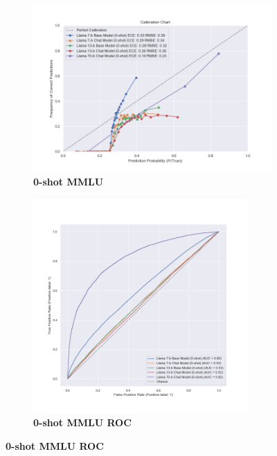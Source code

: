 \documentclass[11pt]{article}
\begin{document}
\begin{figure}
     \centering
     \begin{subfigure}[b]{0.60\textwidth}
         \centering 
         \includegraphics[width=1.1\textwidth]{figures/0-shot-MMLU.png}
         \caption{\textbf{0-shot MMLU} }
         \label{fig:0-shot-MMLU}
     \end{subfigure}
     \hfill
         \begin{subfigure}[b]{0.38\textwidth}
         \centering 
         \includegraphics[width=0.9\textwidth]{figures/0-shot-MMLU-roc.png}
         \caption{\textbf{0-shot MMLU ROC}}
         \label{fig:0-shot-MMLU}

\end{subfigure}
\end{figure}
\end{document}
